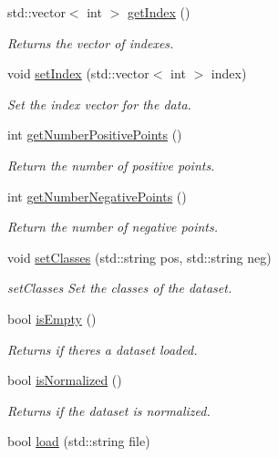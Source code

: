 \begin{DoxyCompactItemize}
std\+::vector$<$ int $>$ \hyperlink{class_data_a16685ae631c5bedc22c974980bc74c05}{get\+Index} ()
\begin{DoxyCompactList}\small\item\em Returns the vector of indexes. \end{DoxyCompactList}\item 
void \hyperlink{class_data_ab2debdff651c70d26f84c9ac20f4dee6}{set\+Index} (std\+::vector$<$ int $>$ index)
\begin{DoxyCompactList}\small\item\em Set the index vector for the data. \end{DoxyCompactList}\item 
int \hyperlink{class_data_a45a39ab2144bcdd0ac1aa67d7d08a6cc}{get\+Number\+Positive\+Points} ()
\begin{DoxyCompactList}\small\item\em Return the number of positive points. \end{DoxyCompactList}\item 
int \hyperlink{class_data_a5166e74e946c2dbac75f383d63f018ea}{get\+Number\+Negative\+Points} ()
\begin{DoxyCompactList}\small\item\em Return the number of negative points. \end{DoxyCompactList}\item 
void \hyperlink{class_data_a6dd8a8a1e1659c76e5716fc8a23a86e2}{set\+Classes} (std\+::string pos, std\+::string neg)
\begin{DoxyCompactList}\small\item\em set\+Classes Set the classes of the dataset. \end{DoxyCompactList}\item 
bool \hyperlink{class_data_a93468d3b8b2ce0f73e369e5de160534e}{is\+Empty} ()
\begin{DoxyCompactList}\small\item\em Returns if there\textquotesingle{}s a dataset loaded. \end{DoxyCompactList}\item 
bool \hyperlink{class_data_ad96fc8e9c5ec9e40b1dc6d9670eefe0c}{is\+Normalized} ()
\begin{DoxyCompactList}\small\item\em Returns if the dataset is normalized. \end{DoxyCompactList}\item 
bool \hyperlink{class_data_ac2ed251251be234c607f486e16902112}{load} (std\+::string file)

\end{DoxyCompactItemize}

